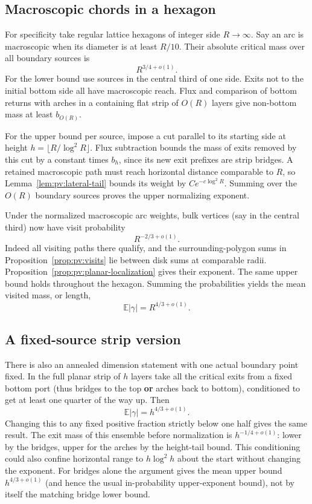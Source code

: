 \subsection{Macroscopic chords in a hexagon}\label{sec:pv:hexagon-proof}

For specificity take regular lattice hexagons of integer side \(R\to\infty\). Say an arc is macroscopic when its diameter is at least \(R/10\). Their absolute critical mass over all boundary sources is
\[
 R^{3/4+o(1)}.
\]
For the lower bound use sources in the central third of one side. Exits not to the initial bottom side all have macroscopic reach. Flux and comparison of bottom returns with arches in a containing flat strip of \(O(R)\) layers give non-bottom mass at least \(b_{O(R)}\).

For the upper bound per source, impose a cut parallel to its starting side at height $h=\lfloor R/\log^2R\rfloor$. Flux subtraction bounds the mass of exits removed by this cut by a constant times $b_h$, since its new exit prefixes are strip bridges. A retained macroscopic path must reach horizontal distance comparable to $R$, so Lemma~\ref{lem:pv:lateral-tail} bounds its weight by $Ce^{-c\log^2R}$. Summing over the $O(R)$ boundary sources proves the upper normalizing exponent.

Under the normalized macroscopic arc weights, bulk vertices (say in the central third) now have visit probability
\[
 R^{-2/3+o(1)}.
\]
Indeed all visiting paths there qualify, and the surrounding-polygon sums in Proposition~\ref{prop:pv:visits} lie between disk sums at comparable radii. Proposition~\ref{prop:pv:planar-localization} gives their exponent. The same upper bound holds throughout the hexagon. Summing the probabilities yields the mean visited mass, or length,
\[
 \mathbb E |\gamma|=R^{4/3+o(1)} .
\]

\subsection{A fixed-source strip version}\label{c01-c1-a-fixed-source-strip-version}

There is also an annealed dimension statement with one actual boundary point fixed. In the full planar strip of \(h\) layers take all the critical exits from a fixed bottom port (thus bridges to the top \textbf{or} arches back to bottom), conditioned to get at least one quarter of the way up. Then
\[
 \mathbb E |\gamma|=h^{4/3+o(1)} .
\]
Changing this to any fixed positive fraction strictly below one half gives the same result. The exit mass of this ensemble before normalization is \(h^{-1/4+o(1)}\): lower by the bridges, upper for the arches by the height-tail bound. This conditioning could also confine horizontal range to \(h\log^2 h\) about the start without changing the exponent. For bridges alone the argument gives the mean upper bound \(h^{4/3+o(1)}\) (and hence the usual in-probability upper-exponent bound), not by itself the matching bridge lower bound.

